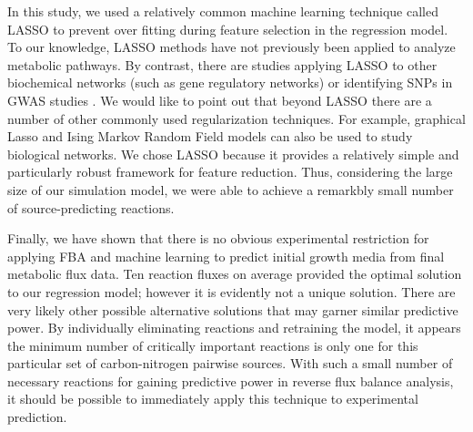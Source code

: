 \documentclass[12pt]{article}
\begin{document}
In this study, we used a relatively common machine learning technique called LASSO to prevent over fitting during feature selection in the regression model. To our knowledge, LASSO methods have not previously been applied to analyze metabolic pathways. By contrast, there are studies applying LASSO to other biochemical networks (such as gene regulatory networks) \cite{Menendezetal2010} or identifying SNPs in GWAS studies \cite{Wuetal2009}. We would like to point out that beyond LASSO there are a number of other commonly used regularization techniques. For example, graphical Lasso \cite{Friedmanetal2008} and Ising Markov Random Field models \cite{Ravikumaretal2010} can also be used to study biological networks. We chose LASSO because it provides a relatively simple and particularly robust framework for feature reduction. Thus, considering the large size of our simulation model, we were able to achieve a remarkbly small number of source-predicting reactions.

Finally, we have shown that there is no obvious experimental restriction for applying FBA and machine learning to predict initial growth media from final metabolic flux data. Ten reaction fluxes on average provided the optimal solution to our regression model; however it is evidently not a unique solution. There are very likely other possible alternative solutions that may garner similar predictive power. By individually eliminating reactions and retraining the model, it appears the minimum number of critically important reactions is only one for this particular set of carbon-nitrogen pairwise sources.  With such a small number of necessary reactions for gaining predictive power in reverse flux balance analysis, it should be possible to immediately apply this technique to experimental prediction. 

\end{document}
